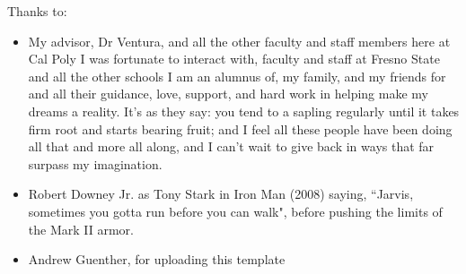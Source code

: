 \noindent
Thanks to:
\begin{itemize}
    \item My advisor, Dr Ventura, and all the other faculty and staff members here at Cal Poly I was fortunate to interact with, faculty and staff at Fresno State and all the other schools I am an alumnus of, my family, and my friends for and all their guidance, love, support, and hard work in helping make my dreams a reality. It's as they say: you tend to a sapling regularly until it takes firm root and starts bearing fruit; and I feel all these people have been doing all that and more all along, and I can't wait to give back in ways that far surpass my imagination.
    \item Robert Downey Jr. as Tony Stark in Iron Man (2008) saying, ``Jarvis, sometimes you gotta run before you can walk", before pushing the limits of the Mark II armor.
    \item Andrew Guenther, for uploading this template
\end{itemize}
